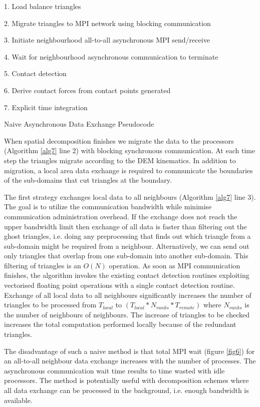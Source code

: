 \documentclass[times,12pt]{article}
\begin{document}
\begin{algorithm}
1. Load balance triangles

2. Migrate triangles to MPI network using blocking communication

3. Initiate neighbourhood all-to-all asynchronous MPI send/receive

4. Wait for neighbourhood asynchronous communication to terminate

5. Contact detection 

6. Derive contact forces from contact points generated

7. Explicit time integration

\protect\caption{\label{alg7}Naive Asynchronous Data Exchange Pseudocode}
\end{algorithm}


When spatial decomposition finishes we migrate the data to the processors (Algorithm \ref{alg7} line 2) with blocking synchronous communication. At each time step the triangles migrate according to the DEM kinematics. In addition to migration, a local area data exchange is required to communicate the boundaries of the sub-domains that cut triangles at the boundary. 

The first strategy exchanges local data to all neighbours (Algorithm \ref{alg7} line 3).  The goal is to utilize the communication bandwidth while minimise communication administration
overhead. If the exchange does not reach the upper bandwidth limit then exchange of all data is faster than filtering out the ghost triangles, i.e. doing any preprocessing that finds out which triangle from a sub-domain might be required from a neighbour. Alternatively, we can send out only triangles
that overlap from one sub-domain into another sub-domain. This filtering of triangles is an $O(N)$ operation. As soon as MPI communication finishes, the algorithm invokes the existing contact
detection routines exploiting vectorised floating point operations with a single contact detection routine. Exchange of all local data to all neighbours significantly increases the number of triangles to be processed from $T_{local}$ to $(T_{local} * N_{ranks} * T_{remote})$ where $N_{ranks}$ is the number of neighbours of neighbours. The increase of triangles to be checked increases the total computation performed locally because of the redundant triangles.

The disadvantage of such a naive method is that total MPI wait (figure \ref{fig6}) for an all-to-all neighbour data exchange increases with the number of processes. The asynchronous communication wait time results to time wasted with idle processors. The method is potentially useful with decomposition schemes where all data exchange can be processed in the background, i.e. enough bandwidth is available.
\end{document}
